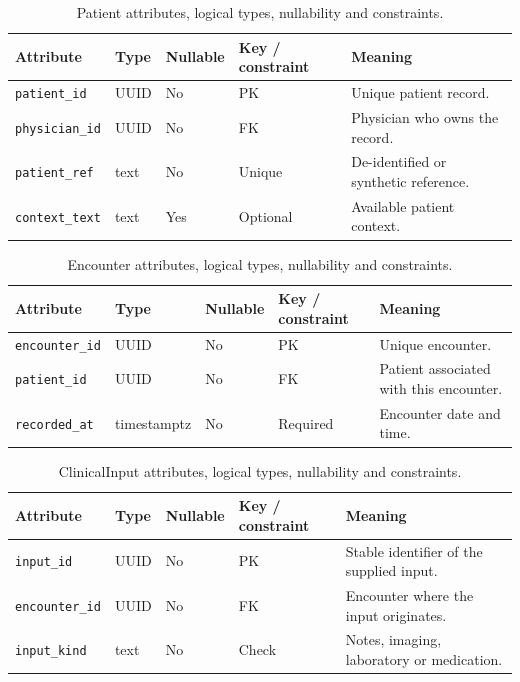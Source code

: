 \begin{table}[htbp]
\setlength{\tabcolsep}{5pt}
\centering
\small
\caption{Patient attributes, logical types, nullability and constraints.}
\label{tab:kashaf:dict-patient}
\begin{tabular}{|p{}|p{}|p{}|p{}|p{}|}
\hline
Attribute & Type & Nullable & Key / constraint & Meaning \\ \hline
\texttt{patient\_id} & UUID & No & PK & Unique patient record. \\ \hline
\texttt{physician\_id} & UUID & No & FK & Physician who owns the record. \\ \hline
\texttt{patient\_ref} & text & No & Unique & De-identified or synthetic reference. \\ \hline
\texttt{context\_text} & text & Yes & Optional & Available patient context. \\ \hline
\end{tabular}
\end{table}

\begin{table}[htbp]
\setlength{\tabcolsep}{5pt}
\centering
\small
\caption{Encounter attributes, logical types, nullability and constraints.}
\label{tab:kashaf:dict-encounter}
\begin{tabular}{|p{}|p{}|p{}|p{}|p{}|}
\hline
Attribute & Type & Nullable & Key / constraint & Meaning \\ \hline
\texttt{encounter\_id} & UUID & No & PK & Unique encounter. \\ \hline
\texttt{patient\_id} & UUID & No & FK & Patient associated with this encounter. \\ \hline
\texttt{recorded\_at} & timestamptz & No & Required & Encounter date and time. \\ \hline
\end{tabular}
\end{table}

\begin{table}[htbp]
\setlength{\tabcolsep}{5pt}
\centering
\small
\caption{ClinicalInput attributes, logical types, nullability and constraints.}
\label{tab:kashaf:dict-clinicalinput}
\begin{tabular}{|p{}|p{}|p{}|p{}|p{}|}
\hline
Attribute & Type & Nullable & Key / constraint & Meaning \\ \hline
\texttt{input\_id} & UUID & No & PK & Stable identifier of the supplied input. \\ \hline
\texttt{encounter\_id} & UUID & No & FK & Encounter where the input originates. \\ \hline
\texttt{input\_kind} & text & No & Check & Notes, imaging, laboratory or medication. \\ \hline
\end{tabular}
\end{table}

